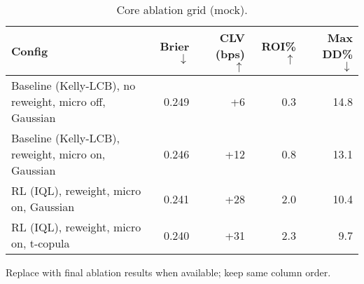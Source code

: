 \begin{table}[t]
  \centering
  \small
  \begin{adjustbox}{max width=\linewidth}
  \begin{threeparttable}
    \caption{Core ablation grid (mock).}
    \label{tab:core-ablations}
    \setlength{\tabcolsep}{3.0pt}\renewcommand{\arraystretch}{1.12}
    \begin{tabularx}{\linewidth}{@{} Y r r r r @{} }
      \toprule
      \textbf{Config} & \textbf{Brier $\downarrow$} & \textbf{CLV (bps) $\uparrow$} & \textbf{ROI\% $\uparrow$} & \textbf{Max DD\% $\downarrow$} \\
      \midrule
      Baseline (Kelly‑LCB), no reweight, micro off, Gaussian & 0.249 & +6  & 0.3 & 14.8 \\
      Baseline (Kelly‑LCB), reweight, micro on, Gaussian     & 0.246 & +12 & 0.8 & 13.1 \\
      RL (IQL), reweight, micro on, Gaussian                 & 0.241 & +28 & 2.0 & 10.4 \\
      RL (IQL), reweight, micro on, t-copula                 & 0.240 & +31 & 2.3 &  9.7 \\
      \bottomrule
    \end{tabularx}
    \begin{tablenotes}[flushleft]\footnotesize\RaggedRight
      \item Replace with final ablation results when available; keep same column order.
    \end{tablenotes}
  \end{threeparttable}
  \end{adjustbox}
\end{table}
